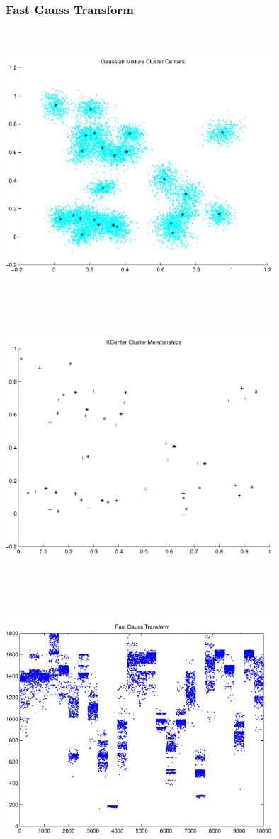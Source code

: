 \documentclass[9pt]{article}
\theoremstyle{plain}
\theoremstyle{definition}
\theoremstyle{remark}
\numberwithin{equation}{section}
\begin{document}
\subsubsection{Fast Gauss Transform}
\includegraphics[width=10.0cm,height=10.0cm]{GaussianMixture_ClusterCenters25_Centers.pdf}

\includegraphics[width=10.0cm,height=10.0cm]{KCenterClusterMemberships_25_Centers.pdf}

\includegraphics[width=10.0cm,height=10.0cm]{FGT25_Centers.pdf}
\end{document}
